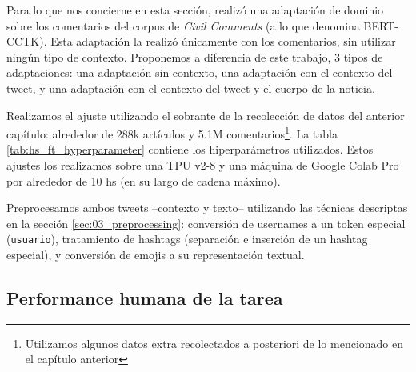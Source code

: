 Para lo que nos concierne en esta sección, \citet{pavlopoulos2020toxicity} realizó una adaptación de dominio sobre los comentarios del corpus de \emph{Civil Comments} (a lo que denomina BERT-CCTK). Esta adaptación la realizó únicamente con los comentarios, sin utilizar ningún tipo de contexto. Proponemos a diferencia de este trabajo, 3 tipos de adaptaciones: una adaptación sin contexto, una adaptación con el contexto del tweet, y una adaptación con el contexto del tweet y el cuerpo de la noticia.

Realizamos el ajuste utilizando el sobrante de la recolección de datos del anterior capítulo: alrededor de 288k artículos y 5.1M comentarios\footnote{Utilizamos algunos datos extra recolectados a posteriori de lo mencionado en el capítulo anterior}. La tabla \ref{tab:hs_ft_hyperparameter} contiene los hiperparámetros utilizados. Estos ajustes los realizamos sobre una TPU v2-8 y una máquina de Google Colab Pro por alrededor de 10 hs (en su largo de cadena máximo).

Preprocesamos ambos tweets --contexto y texto-- utilizando las técnicas descriptas en la sección \ref{sec:03_preprocessing}: conversión de usernames a un token especial (\verb|usuario|), tratamiento de hashtags (separación e inserción de un hashtag especial), y conversión de emojis a su representación textual.


\subsection{Performance humana de la tarea}


